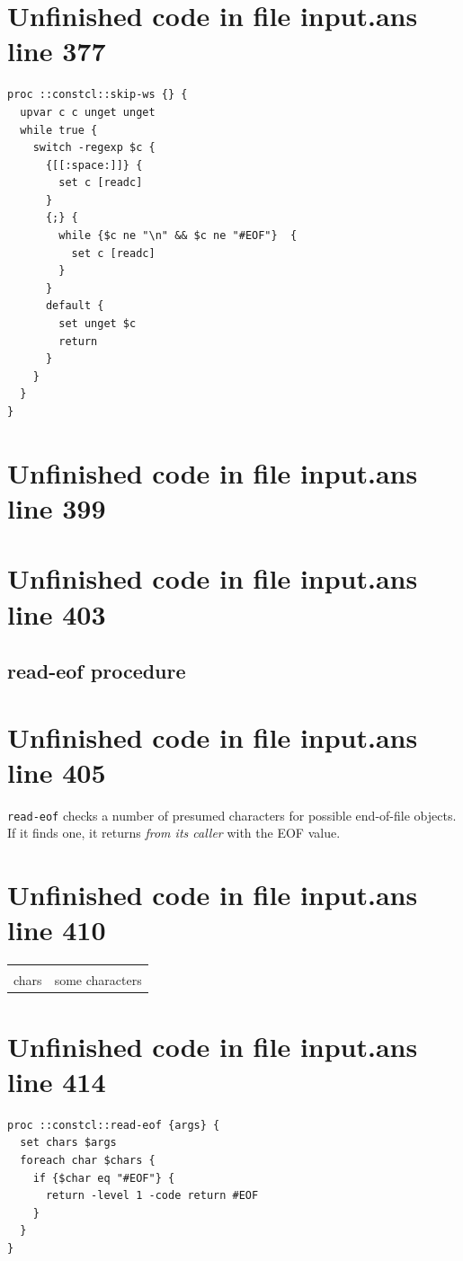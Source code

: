 \documentclass[twoside,9pt]{report}
\begin{document}
\section{Unfinished code in file input.ans line 377}
\begin{lstlisting}
proc ::constcl::skip-ws {} {
  upvar c c unget unget
  while true {
    switch -regexp $c {
      {[[:space:]]} {
        set c [readc]
      }
      {;} {
        while {$c ne "\n" && $c ne "#EOF"}  {
          set c [readc]
        }
      }
      default {
        set unget $c
        return
      }
    }
  }
}
\end{lstlisting}
\section{Unfinished code in file input.ans line 399}
\section{Unfinished code in file input.ans line 403}
\subsection{read-eof procedure}
\label{read-eof-procedure}
\section{Unfinished code in file input.ans line 405}


\texttt{read-eof} checks a number of presumed characters for possible end-of-file objects. If it finds one, it returns \emph{from its caller} with the EOF value.

\section{Unfinished code in file input.ans line 410}
\noindent\begin{tabular}{ |p{1.9cm} p{8cm}| }
\hline
\rowcolor[HTML]{CCCCCC} \multicolumn{2}{|l|}{\bf read-eof (internal)} \\
chars & some characters \\
\hline
\end{tabular}
\section{Unfinished code in file input.ans line 414}
\begin{lstlisting}
proc ::constcl::read-eof {args} {
  set chars $args
  foreach char $chars {
    if {$char eq "#EOF"} {
      return -level 1 -code return #EOF
    }
  }
}
\end{lstlisting}
\end{document}
